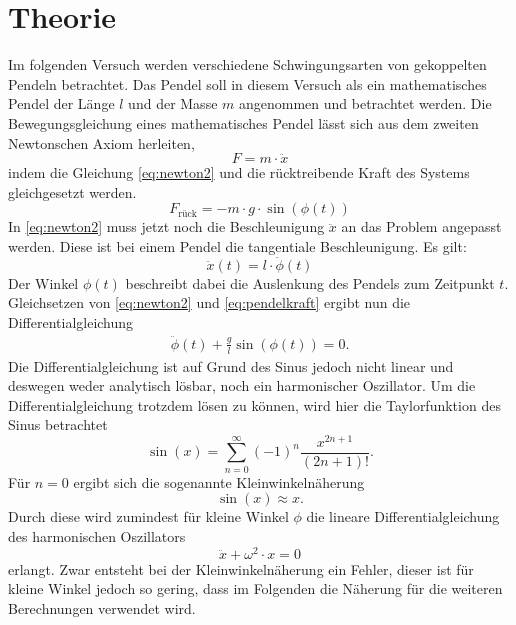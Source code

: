 \section{Theorie}
Im folgenden Versuch werden verschiedene Schwingungsarten von gekoppelten Pendeln betrachtet. Das Pendel soll in diesem Versuch als ein mathematisches Pendel der Länge $l$ und der Masse $m$ angenommen und betrachtet werden.
Die Bewegungsgleichung eines mathematisches Pendel lässt sich aus dem zweiten Newtonschen Axiom herleiten,
\begin{equation}
  F=m\cdot\ddot{x} \label{eq:newton2}
\end{equation}
indem die Gleichung \eqref{eq:newton2} und die rücktreibende Kraft des Systems gleichgesetzt werden.
\begin{equation}
  F_\text{rück}=-m\cdot g\cdot \sin(\phi(t)) \label{eq:pendelkraft}
\end{equation}
In \eqref{eq:newton2} muss jetzt noch die Beschleunigung $\ddot x$ an das Problem angepasst werden. Diese ist bei einem Pendel die tangentiale
Beschleunigung. Es gilt:
\begin{equation*}
  \ddot x(t)=l\cdot \ddot{\phi}(t)
\end{equation*}
Der Winkel $\phi(t)$ beschreibt dabei die Auslenkung des Pendels zum Zeitpunkt $t$. Gleichsetzen von \eqref{eq:newton2} und
\eqref{eq:pendelkraft} ergibt nun die Differentialgleichung
\begin{eqnarray*}
  \ddot{\phi}(t)+\frac{g}{l}\sin(\phi(t))=0.
\end{eqnarray*}
Die Differentialgleichung ist auf Grund des Sinus jedoch nicht linear und deswegen weder analytisch lösbar, noch ein harmonischer Oszillator.
Um die Differentialgleichung trotzdem lösen zu können, wird hier die Taylorfunktion des Sinus betrachtet
\begin{equation*}
  \sin(x)=\sum_{n=0}^\infty (-1)^n\frac{x^{2n+1}}{(2n+1)!}.
\end{equation*}
Für $n=0$ ergibt sich die sogenannte Kleinwinkelnäherung
\begin{equation}
  \sin(x)\approx x. \label{eq:kleinwinkel}
\end{equation}
Durch diese wird zumindest für kleine Winkel $\phi$ die lineare Differentialgleichung des harmonischen Oszillators
\begin{equation}
  \ddot{x}+\omega^2\cdot x=0 \label{eq:harmOsz}
\end{equation}
erlangt. Zwar entsteht bei der Kleinwinkelnäherung ein Fehler, dieser ist für kleine Winkel jedoch so gering, dass im Folgenden die Näherung für die weiteren Berechnungen verwendet wird.
